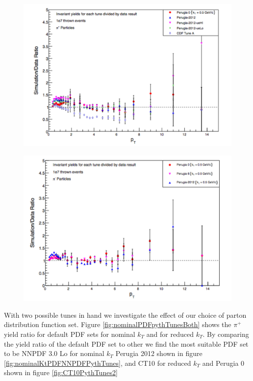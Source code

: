 \documentclass[abstract = on,listof=totoc, bibliography=totoc]{scrreprt}
\begin{document}
\begin{figure}
\begin{center}
\includegraphics[width = .77\textwidth]{pythiaTunesLowKt}
\caption[]{}
\label{fig:pythTunesLowKt}
\end{center}
\end{figure}

\begin{figure}
\begin{center}
\includegraphics[width = .75\textwidth]{multLowKt}
\caption[]{}
\label{fig:multLowKt}
\end{center}
\end{figure}

With two possible tunes in hand we investigate the effect of our choice of parton distribution function set. Figure \ref{fig:nominalPDFpythTunesBoth} shows the $\pi^+$ yield ratio for default PDF sets for nominal $k_T$ and for reduced $k_T$. By comparing the yield ratio of the default PDF set to other we find the most suitable PDF set to be NNPDF 3.0 Lo for nominal $k_T$ Perugia 2012 shown in figure \ref{fig:nominalKtPDFNNPDFPythTunes}, and CT10 for reduced $k_T$ and Perugia 0 shown in figure \ref{fig:CT10PythTunes2} 
\end{document}
